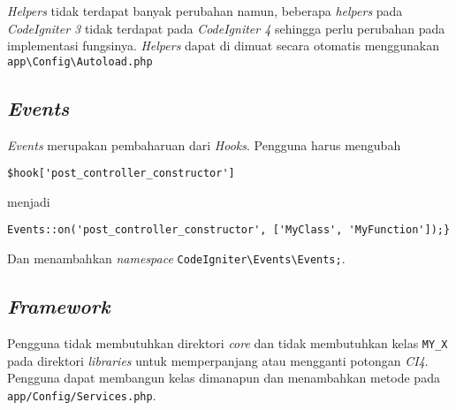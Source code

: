 \textit{Helpers} tidak terdapat banyak perubahan namun, beberapa \textit{helpers} pada \textit{CodeIgniter 3} tidak terdapat pada \textit{CodeIgniter 4} sehingga perlu perubahan pada implementasi fungsinya. \textit{Helpers} dapat di dimuat secara otomatis menggunakan \verb|app\Config\Autoload.php|

\subsection{\textit{Events}}
\textit{Events} merupakan pembaharuan dari \textit{Hooks}. Pengguna harus mengubah
\begin{center}
	\verb|$hook['post_controller_constructor']|
\end{center} 
menjadi 
\begin{center} \verb|Events::on('post_controller_constructor', ['MyClass', 'MyFunction']);}|
\end{center}
Dan menambahkan \textit{namespace} \verb|CodeIgniter\Events\Events;|. 

\subsection{\textit{Framework}}
Pengguna tidak membutuhkan direktori \textit{core} dan tidak membutuhkan kelas \verb|MY_X| pada direktori \textit{libraries} untuk memperpanjang atau mengganti potongan \textit{CI4}. Pengguna dapat membangun kelas dimanapun dan menambahkan metode pada \verb|app/Config/Services.php|.


